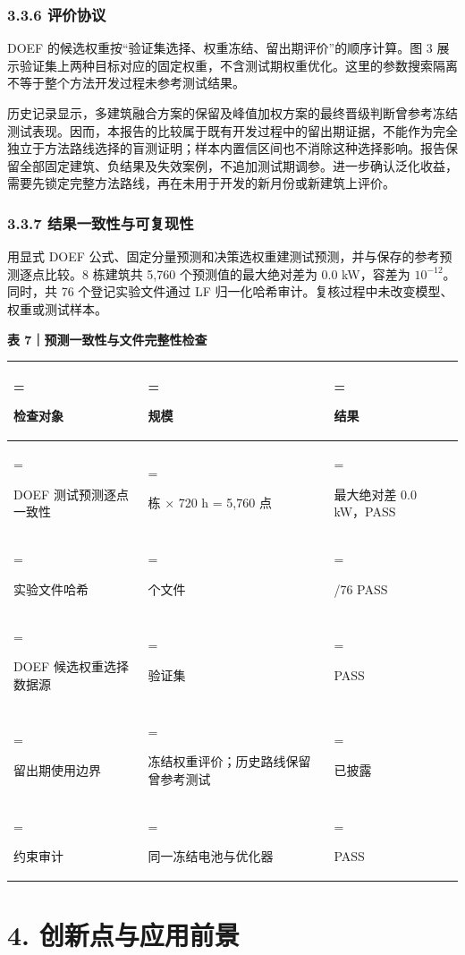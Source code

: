 \documentclass[12pt,a4paper]{article}
\begin{document}
\subsubsection{3.3.6 评价协议}
DOEF 的候选权重按“验证集选择、权重冻结、留出期评价”的顺序计算。图 3 展示验证集上两种目标对应的固定权重，不含测试期权重优化。这里的参数搜索隔离不等于整个方法开发过程未参考测试结果。\par
历史记录显示，多建筑融合方案的保留及峰值加权方案的最终晋级判断曾参考冻结测试表现。因而，本报告的比较属于既有开发过程中的留出期证据，不能作为完全独立于方法路线选择的盲测证明；样本内置信区间也不消除这种选择影响。报告保留全部固定建筑、负结果及失效案例，不追加测试期调参。进一步确认泛化收益，需要先锁定完整方法路线，再在未用于开发的新月份或新建筑上评价。\par
\subsubsection{3.3.7 结果一致性与可复现性}
用显式 DOEF 公式、固定分量预测和决策选权重建测试预测，并与保存的参考预测逐点比较。8 栋建筑共 5,760 个预测值的最大绝对差为 0.0 kW，容差为 \(10^{-12}\)。同时，共 76 个登记实验文件通过 LF 归一化哈希审计。复核过程中未改变模型、权重或测试样本。\par
\par\noindent\begin{minipage}{\linewidth}\textbf{表 7｜预测一致性与文件完整性检查}\par\smallskip\renewcommand{\arraystretch}{1.2}\begin{tabularx}{\linewidth}{>{\hsize=1.4\hsize\linewidth=\hsize\raggedright\arraybackslash}X>{\hsize=0.8\hsize\linewidth=\hsize\raggedright\arraybackslash}X>{\hsize=0.8\hsize\linewidth=\hsize\raggedright\arraybackslash}X}\toprule
检查对象 & 规模 & 结果\\\midrule
DOEF 测试预测逐点一致性 & 8 栋 × 720 h = 5,760 点 & 最大绝对差 0.0 kW，PASS\\
实验文件哈希 & 76 个文件 & 76/76 PASS\\
DOEF 候选权重选择数据源 & 验证集 & PASS\\
留出期使用边界 & 冻结权重评价；历史路线保留曾参考测试 & 已披露\\
约束审计 & 同一冻结电池与优化器 & PASS\\
\bottomrule\end{tabularx}\end{minipage}\par
\clearpage
\section{4. 创新点与应用前景}
\end{document}
